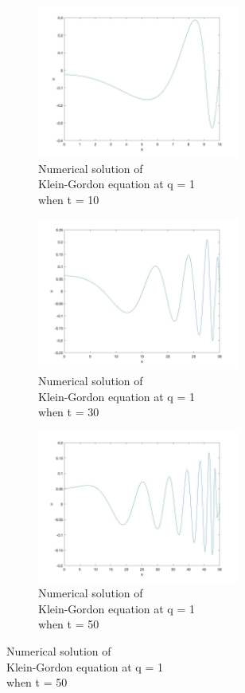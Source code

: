 \documentclass[a4paper,11pt]{article}
\begin{document}
\begin{figure}[H]
 \begin{subfigure}{0.5\textwidth}
 \includegraphics[width = \linewidth, height =5cm]{Q3(a).jpg}
 \caption{Numerical solution of \\Klein-Gordon equation at q = 1 \\when t = 10}
 \label{Q3(a)}
 \end{subfigure}
  \begin{subfigure}{0.5\textwidth}
 \includegraphics[width = \linewidth, height =5cm]{Q3(b).jpg}
 \caption{Numerical solution of \\Klein-Gordon equation at q = 1 \\when t = 30}
 \label{Q3(b)}
 \end{subfigure}
 \begin{subfigure}{0.5\textwidth}
 \includegraphics[width = \linewidth, height =5cm]{Q3(c).jpg}
 \caption{Numerical solution of \\Klein-Gordon equation at q = 1 \\when t = 50}

\end{subfigure}
\end{figure}
\end{document}
